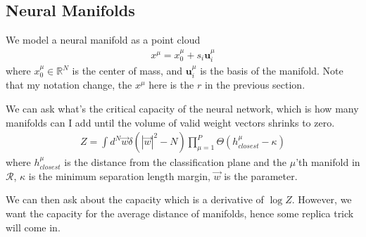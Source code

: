 \subsection{Neural Manifolds}
We model a neural manifold as a point cloud 
\begin{align}
	x^\mu = x_0^\mu + s_i \mathbf u_i^\mu
\end{align}
where $x_0^\mu \in \mathbb R^N$ is the center of mass, and $\mathbf u_i^\mu$ is the basis of the manifold. Note that my notation change, the $x^\mu$ here is the $r$ in the previous section.

We can ask what's the critical capacity of the neural network, which is how many manifolds can I add until the volume of valid weight vectors shrinks to zero.
\begin{align}
	Z = \int d^N \vec w \delta( |\vec w|^2 - N) \prod_{\mu=1}^P \Theta(h_{closest}^\mu - \kappa)
\end{align}
where $h_{closest}^\mu$ is the distance from the classification plane and the $\mu$'th manifold in $\mathcal R$, $\kappa$ is the minimum separation length margin, $\vec w$ is the parameter. 

We can then ask about the capacity which is a derivative of $\log Z$. However, we want the capacity for the average distance of manifolds, hence some replica trick will come in.
































